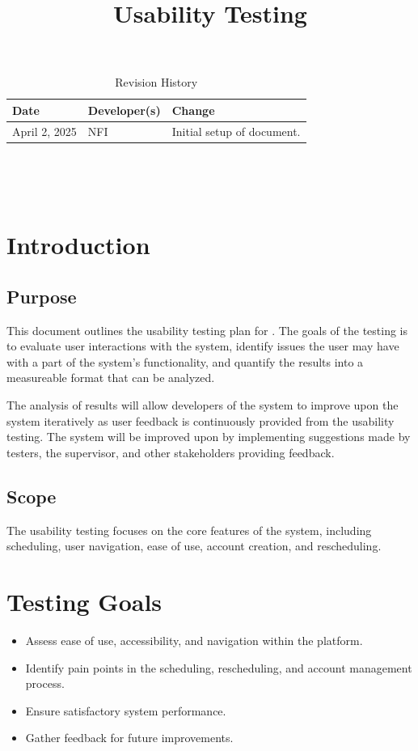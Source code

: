 \documentclass{article}
\title{Usability Testing\\\progname}
\author{\authname}
\date{}
\begin{document}
\begin{table}[hp]
\caption{Revision History} \label{TblRevisionHistory}
\begin{tabularx}{\textwidth}{llX}
\toprule
\textbf{Date} & \textbf{Developer(s)} & \textbf{Change}\\
\midrule
April 2, 2025 & NFI & Initial setup of document.\\
\bottomrule
\end{tabularx}
\end{table}

\newpage

\maketitle

~\newpage


\tableofcontents

\listoffigures

~\newpage

\section{Introduction}
    \subsection{Purpose}
    This document outlines the usability testing plan for \progname. The goals of the
    testing is to evaluate user interactions with the system, identify issues the user
    may have with a part of the system's functionality, and quantify the results into
    a measureable format that can be analyzed.

    The analysis of results will allow developers of the system to improve upon
    the system iteratively as user feedback is continuously provided from the usability
    testing. The system will be improved upon by implementing suggestions made by
    testers, the supervisor, and other stakeholders providing feedback.
    
    \subsection{Scope}
    The usability testing focuses on the core features of the system, including
    scheduling, user navigation, ease of use, account creation, and rescheduling.

\section{Testing Goals}
    \begin{itemize}
        \item Assess ease of use, accessibility, and navigation within the platform.
        \item Identify pain points in the scheduling, rescheduling, and account
        management process.
        \item Ensure satisfactory system performance.
        \item Gather feedback for future improvements.
    \end{itemize}
\end{document}
